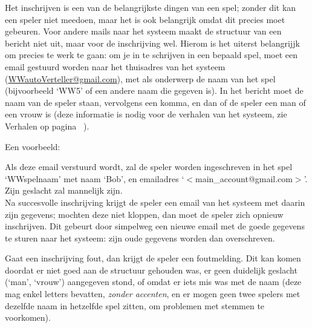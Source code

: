 \documentclass[12pt]{article}
\begin{document}
    Het inschrijven is een van de belangrijkste dingen van een spel; zonder dit kan een speler niet meedoen, maar het is ook belangrijk omdat dit precies moet gebeuren. Voor andere mails naar het systeem maakt de structuur van een bericht niet uit, maar voor de inschrijving wel. Hierom is het uiterst belangrijjk om precies te werk te gaan: om je in te schrijven in een bepaald spel, moet een email gestuurd worden naar het thuisadres van het systeem (\href{mailto:<WWautoVerteller@gmail.com>}{WWautoVerteller@gmail.com}), met als onderwerp de naam van het spel (bijvoorbeeld `WW5' of een andere naam die gegeven is). In het bericht moet de naam van de speler staan, vervolgens een komma, en dan of de speler een man of een vrouw is (deze informatie is nodig voor de verhalen van het systeem, zie Verhalen op pagina~\pageref{subsec:verhalen} ).
    
    Een voorbeeld:
    
    \begin{center}
    \end{center}
    
    Als deze email verstuurd wordt, zal de speler worden ingeschreven in het spel `WWspelnaam' met naam `Bob', en emailadres `$<$main\_account@gmail.com$>$'. Zijn geslacht zal mannelijk zijn.
    \\[\baselineskip]
    Na succesvolle inschrijving krijgt de speler een email van het systeem met daarin zijn gegevens; mochten deze niet kloppen, dan moet de speler zich opnieuw inschrijven. Dit gebeurt door simpelweg een nieuwe email met de goede gegevens te sturen naar het systeem: zijn oude gegevens worden dan overschreven.
    
    Gaat een inschrijving fout, dan krijgt de speler een foutmelding. Dit kan komen doordat er niet goed aan de structuur gehouden was, er geen duidelijk geslacht (`man', `vrouw') aangegeven stond, of omdat er iets mis was met de naam (deze mag enkel letters bevatten, \emph{zonder accenten}, en er mogen geen twee spelers met dezelfde naam in hetzelfde spel zitten, om problemen met stemmen te voorkomen).
\end{document}
